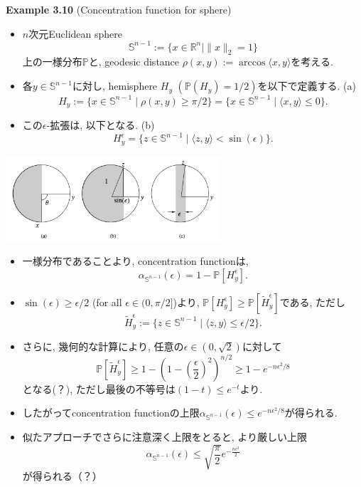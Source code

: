 \documentclass[aspectratio=169, dvipdfmx]{beamer}
\begin{document}
\begin{frame}{}{}
{\bf Example 3.10} (Concentration function for sphere)
\begin{itemize}
    \item $n$次元Euclidean sphere
    \[
        \mathbb{S}^{n-1} := \{x\in \mathbb{R}^n\mid \|x\|_2=1\}
        \tag{3.29}\label{3.29}
    \]
    上の一様分布$\mathbb{P}$と,
    geodesic distance $\rho(x, y):=\arccos\langle x,y\rangle$を考える.
    \item 各$y\in\mathbb{S}^{n-1}$に対し, hemisphere $H_y$ $(\mathbb{P}(H_y)=1/2)$を以下で定義する. (a)
    \[
        H_y
        := \{x\in \mathbb{S}^{n-1}\mid \rho(x,y) \ge \pi/2\}
        = \{ x \in \mathbb{S}^{n-1} \mid \langle x, y\rangle \le 0 \}.
        \tag{3.30}\label{3.30}
    \]
    \item この$\epsilon$-拡張は, 以下となる. (b)
    \[
        H_y^\epsilon = \{z\in \mathbb{S}^{n-1} \mid \langle z, y \rangle < \sin(\epsilon)\}.
        \tag{3.31}\label{3.31}
    \]
\end{itemize}
\begin{center}
    \includegraphics[width=8cm]{figure_3_1.png}
\end{center}
\end{frame}

\begin{frame}{}{}
\begin{itemize}
    \item 一様分布であることより, concentration functionは, 
    \[
        \alpha_{\mathbb{S}^{n-1}}(\epsilon) = 1 - \mathbb{P}[H_y^\epsilon].
        \tag{3.32}\label{3.32}
    \]
    \item $\sin(\epsilon) \ge \epsilon/2$ (for all $\epsilon\in (0,\pi/2]$)より,
    $\mathbb{P}[H_y^\epsilon] \ge \mathbb{P}[\tilde{H}_y^\epsilon]$である, ただし
    \[
        \tilde{H}_y^\epsilon
        := \{z\in \mathbb{S}^{n-1} \mid \langle z, y\rangle \le \epsilon/2\}.
    \]
    \item さらに, 幾何的な計算により, 任意の$\epsilon \in (0, \sqrt{2})$に対して
    \[
        \mathbb{P}[\tilde{H}_y^\epsilon]
        \ge 1 - \left(1-\left(\frac{\epsilon}{2}\right)^2\right)^{n/2}
        \ge 1 - e^{-n\epsilon^2/8}
        \tag{3.33}\label{3.33}
    \]
    となる(？), ただし最後の不等号は$(1-t)\le e^{-t}$より.
    \item したがってconcentration functionの上限$\alpha_{\mathbb{S}^{n-1}}(\epsilon) \le e^{-n\epsilon^2/8}$が得られる.
    \item 似たアプローチでさらに注意深く上限をとると, より厳しい上限
    \[
        \alpha_{\mathbb{S}^{n-1}}(\epsilon) \le \sqrt{\frac{\pi}{2}}e^{-\frac{n\epsilon^2}{2}}
        \tag{3.34}\label{3.34}
    \]
    が得られる（？）
\end{itemize}
\end{frame}
\end{document}
